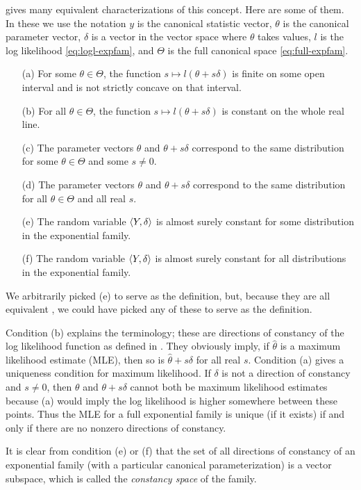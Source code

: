 \citet[Theorem~1]{geyer-gdor} gives many equivalent
characterizations of this concept.  Here are some of them.
In these we use the notation $y$ is the canonical statistic vector,
$\theta$ is the canonical parameter vector, $\delta$ is a vector in
the vector space where $\theta$ takes values, $l$ is the log likelihood
\eqref{eq:logl-expfam}, and $\Theta$ is the full canonical space
\eqref{eq:full-expfam}.
\begin{enumerate}
\item[(a)] For some $\theta \in \Theta$,
    the function $s \mapsto l(\theta + s \delta)$ is finite on some open
    interval and is not strictly concave on that interval.
\item[(b)] For all $\theta \in \Theta$,
    the function $s \mapsto l(\theta + s \delta)$ is constant on the
    whole real line.
\item[(c)] The parameter vectors $\theta$ and $\theta + s \delta$ correspond
    to the same distribution for some $\theta \in \Theta$ and some $s \neq 0$.
\item[(d)] The parameter vectors $\theta$ and $\theta + s \delta$ correspond
    to the same distribution for all $\theta \in \Theta$ and all real $s$.
\item[(e)] The random variable $\langle Y, \delta \rangle$ is almost surely constant
    for some distribution in the exponential family.
\item[(f)] The random variable $\langle Y, \delta \rangle$ is almost surely constant
    for all distributions in the exponential family.
\end{enumerate}
We arbitrarily picked (e) to serve as the definition,
but, because they are all equivalent \citep[Theorem~1]{geyer-gdor},
we could have picked any of these to serve as the definition.

Condition (b) explains the terminology; these are directions of
constancy of the log likelihood function as defined in \citet{rockafellar}.
They obviously imply, if $\hat{\theta}$ is a maximum likelihood estimate (MLE),
then so is $\hat{\theta} + s \delta$ for all real $s$.
Condition (a) gives a uniqueness condition for maximum likelihood.
If $\delta$ is not a direction of constancy and $s \neq 0$,
then $\theta$ and $\theta + s \delta$ cannot both be maximum likelihood
estimates because (a) would imply the log likelihood is higher somewhere
between these points.  Thus the MLE for a full
exponential family is unique (if it exists) if and only if there are
no nonzero directions of constancy.

It is clear from condition (e) or (f) that the set of
all directions of constancy of an exponential family
(with a particular canonical parameterization) is a vector subspace,
which is called the \emph{constancy space} of the family.


